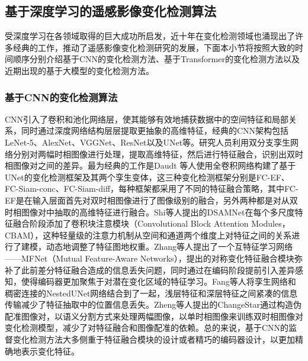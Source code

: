\documentclass[lang=chs, degree=master, blindreview=false, adobe=false]{yanputhesis}
\begin{document}
\subsection{基于深度学习的遥感影像变化检测算法}
受深度学习在各领域取得的巨大成功所启发，近十年在变化检测领域也涌现出了许多经典的工作，推动了遥感影像变化检测研究的发展，下面本小节将按照大致的时间顺序分别介绍基于CNN的变化检测方法、基于Transformer的变化检测方法以及近期出现的基于大模型的变化检测方法。
\subsubsection{基于CNN的变化检测算法}
CNN引入了卷积和池化网络层，使其能够有效地捕获数据中的空间特征和局部关系，同时通过深度网络结构层层提取更抽象的高维特征，经典的CNN架构包括LeNet-5\cite{lecun1998lenet}、AlexNet\cite{krizhevsky2012alexnet}、VGGNet\cite{simonyan2014VGG}、ResNet\cite{He2015ResNet}以及UNet\cite{ronneberger2015Unet}等。研究人员利用双分支孪生网络分别对两幅时相图像进行处理，提取高维特征，然后进行特征融合，识别出双时相图像对之间的差异。最为经典的工作是Daudt 等人\cite{daudt2018FC-EF}使用全卷积网络构建了基于UNet的变化检测框架及其两个孪生变体，这三种变化检测框架分别是FC-EF、FC-Siam-conc、FC-Siam-diff，每种框架都采用了不同的特征融合策略，其中FC-EF是在输入层面首先对双时相图像进行了图像级别的融合，另外两种都是对从双时相图像对中抽取的高维特征进行融合。Shi等人\cite{shi2021DSAMNet}提出的DSAMNet在每个多尺度特征融合阶段添加了卷积块注意模块\cite{woo2018cbam}（Convolutional Block Attention Modules，CBAM），这种轻量级的注意力机制从空间和通道两个维度上对特征之间的关系进行了建模，动态地调整了特征图地权重。Zhang等人\cite{zhang2023MFNet}提出了一个互特征学习网络——MFNet（Mutual Feature-Aware Networks），提出的对称变化特征融合模块弥补了此前差分特征融合造成的信息丢失问题，同时通过在编码阶段提前引入差异感知，使得编码器更加聚焦于对潜在变化区域的特征学习。Fang等人\cite{fang2021SNUNet}将孪生网络和稠密连接的NestedUNet网络\cite{zhou2018unet++}结合到了一起，浅层特征和深层特征之间紧凑的信息传输减少了特征抽取中的位置信息丢失。Zheng等人提出的ChangeStar\cite{zheng2021changestar}通过构造伪配准图像对，以语义分割方式来处理两幅图像，以单时相图像来训练双时相图像对变化检测模型，减少了对特征融合和图像配准的依赖。总的来说，基于CNN的监督变化检测方法大多侧重于特征融合模块的设计或者精巧的编码器设计，以更加精确地表示变化特征。
\end{document}
